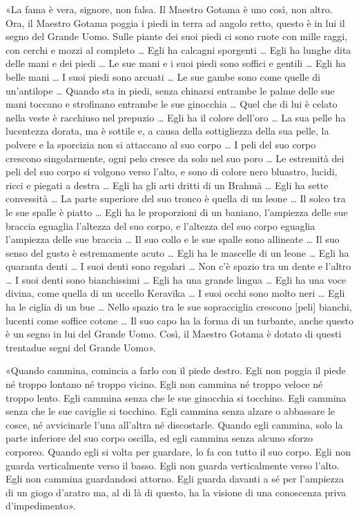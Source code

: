 «La fama è vera, signore, non falsa. Il Maestro Gotama è uno così, non
altro. Ora, il Maestro Gotama poggia i piedi in terra ad angolo retto,
questo è in lui il segno del Grande Uomo. Sulle piante dei suoi piedi ci
sono ruote con mille raggi, con cerchi e mozzi al completo … Egli ha
calcagni sporgenti … Egli ha lunghe dita delle mani e dei piedi … Le sue
mani e i suoi piedi sono soffici e gentili … Egli ha belle mani … I suoi
piedi sono arcuati … Le sue gambe sono come quelle di un’antilope …
Quando sta in piedi, senza chinarsi entrambe le palme delle sue mani
toccano e strofinano entrambe le sue ginocchia … Quel che di lui è
celato nella veste è racchiuso nel prepuzio … Egli ha il colore dell’oro
… La sua pelle ha lucentezza dorata, ma è sottile e, a causa della
sottigliezza della sua pelle, la polvere e la sporcizia non si attaccano
al suo corpo … I peli del suo corpo crescono singolarmente, ogni pelo
cresce da solo nel suo poro … Le estremità dei peli del suo corpo si
volgono verso l’alto, e sono di colore nero bluastro, lucidi, ricci e
piegati a destra … Egli ha gli arti dritti di un Brahmā … Egli ha sette
convessità … La parte superiore del suo tronco è quella di un leone … Il
solco tra le sue spalle è piatto … Egli ha le proporzioni di un baniano,
l’ampiezza delle sue braccia eguaglia l’altezza del suo corpo, e
l’altezza del suo corpo eguaglia l’ampiezza delle sue braccia … Il suo
collo e le sue spalle sono allineate … Il suo senso del gusto è
estremamente acuto … Egli ha le mascelle di un leone … Egli ha quaranta
denti … I suoi denti sono regolari … Non c’è spazio tra un dente e
l’altro … I suoi denti sono bianchissimi … Egli ha una grande lingua …
Egli ha una voce divina, come quella di un uccello Keravīka … I suoi
occhi sono molto neri … Egli ha le ciglia di un bue … Nello spazio tra
le sue sopracciglia crescono [peli] bianchi, lucenti come soffice cotone
… Il suo capo ha la forma di un turbante, anche questo è un segno in lui
del Grande Uomo. Così, il Maestro Gotama è dotato di questi trentadue
segni del Grande Uomo».


«Quando cammina, comincia a farlo con il piede destro. Egli non poggia
il piede né troppo lontano né troppo vicino. Egli non cammina né troppo
veloce né troppo lento. Egli cammina senza che le sue ginocchia si
tocchino. Egli cammina senza che le sue caviglie si tocchino. Egli
cammina senza alzare o abbassare le cosce, né avvicinarle l’una
all’altra né discostarle. Quando egli cammina, solo la parte inferiore
del suo corpo oscilla, ed egli cammina senza alcuno sforzo corporeo.
Quando egli si volta per guardare, lo fa con tutto il suo corpo. Egli
non guarda verticalmente verso il basso. Egli non guarda verticalmente
verso l’alto. Egli non cammina guardandosi attorno. Egli guarda davanti
a sé per l’ampiezza di un giogo d’aratro ma, al di là di questo, ha la
visione di una conoscenza priva d’impedimento».


